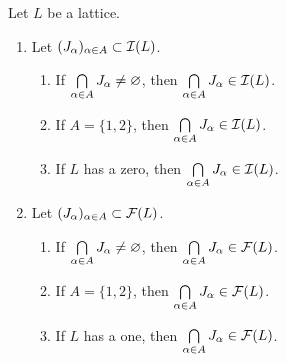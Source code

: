 \documentclass{book}
\begin{document}
	\begin{ex}
		Let $L$ be a lattice. 
		\begin{enumerate}
			\item Let $(J_{\alpha})_{\alpha \in A} \subset \mathcal{I}(L)$. 
			\begin{enumerate}
				\item If $\bigcap\limits_{\alpha \in A} J_{\alpha} \neq \varnothing$, then $\bigcap\limits_{\alpha \in A} J_{\alpha} \in \mathcal{I}(L)$. 
				\item If $A = \{1,2\}$, then $\bigcap\limits_{\alpha \in A} J_{\alpha} \in \mathcal{I}(L)$.
				\item If $L$ has a zero, then $\bigcap\limits_{\alpha \in A} J_{\alpha} \in \mathcal{I}(L)$.
			\end{enumerate}
			\item Let $(J_{\alpha})_{\alpha \in A} \subset \mathcal{F}(L)$. 
			\begin{enumerate}
				\item If $\bigcap\limits_{\alpha \in A} J_{\alpha} \neq \varnothing$, then $\bigcap\limits_{\alpha \in A} J_{\alpha} \in \mathcal{F}(L)$. 
				\item If $A = \{1,2\}$, then $\bigcap\limits_{\alpha \in A} J_{\alpha} \in \mathcal{F}(L)$.
				\item If $L$ has a one, then $\bigcap\limits_{\alpha \in A} J_{\alpha} \in \mathcal{F}(L)$. 
			\end{enumerate}
		\end{enumerate}
	\end{ex}
	
\end{document}
